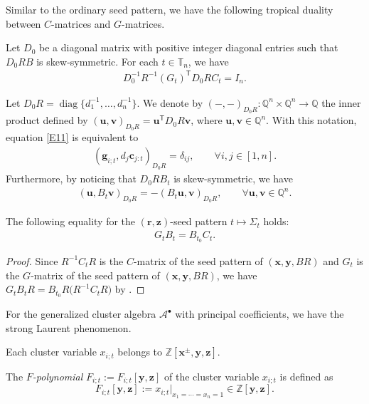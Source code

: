 Similar to the ordinary seed pattern, we have the following tropical duality between $C$-matrices and $G$-matrices.
\begin{Proposition}\label{P4}
 Let $D_0$ be a diagonal matrix with positive integer diagonal entries such that $D_0RB$ is skew-symmetric. For each $t\in \mathbb{T}_n$, we have
\begin{align}\label{E11}
D_0^{-1}R^{-1}(G_t)^{\mathsf T}D_0RC_t=I_n.
\end{align}
\end{Proposition}
Let $D_0R=\operatorname{diag}\bigl\{d_1^{-1},\dots, d_n^{-1}\bigr\}$. We denote by $(-,-)_{D_0R}\colon \mathbb{Q}^n\times \mathbb{Q}^n\to \mathbb{Q}$ the inner product defined by $(\mathbf{u},\mathbf{v})_{D_0R}=\mathbf{u}^{\mathsf T}D_0R\mathbf{v}$, where $\mathbf{u},\mathbf{v}\in \mathbb{Q}^n$. With this notation, equation \eqref{E11} is equivalent to
\begin{align}\label{E12}
 (\mathbf{g}_{i;t},d_j\mathbf{c}_{j:t})_{D_0R}=\delta_{ij},\qquad \forall i,j\in[1,n].
\end{align}
Furthermore, by noticing that $D_0RB_t$ is skew-symmetric, we have
\begin{align*}
 (\mathbf{u},B_t\mathbf{v})_{D_0R}=-(B_t\mathbf{u},\mathbf{v})_{D_0R},\qquad \forall  \mathbf{u},\mathbf{v}\in \mathbb{Q}^n.
\end{align*}

\begin{Proposition}\label{P5}
 The following equality for the $(\mathbf{r},\mathbf{z})$-seed pattern $t\mapsto \Sigma_t$ holds:
 \begin{align}\label{E14}
 G_tB_t=B_{t_0}C_t.
 \end{align}
\end{Proposition}
\begin{proof}
Since $R^{-1}C_tR$ is the $C$-matrix of the seed pattern of $(\mathbf{x},\mathbf{y}, BR)$ and $G_t$ is the $G$-matrix of the seed pattern of $(\mathbf{x},\mathbf{y}, BR)$, we have
$
G_tB_tR=B_{t_0}R\bigl(R^{-1}C_tR\bigr)
$
by \cite[equation~(6.14)]{fomin_zelevinsky_2007}.
\end{proof}

For the generalized cluster algebra $\mathcal{A}^\bullet$ with principal coefficients, we have the strong Laurent phenomenon.
\begin{Proposition}
 Each cluster variable $x_{i;t}$ belongs to $\mathbb{Z}[\mathbf{x}^\pm,\mathbf{y},\mathbf{z}]$.
\end{Proposition}
\begin{Definition}
 The {\it $F$-polynomial} $F_{i;t}:=F_{i;t}[\mathbf{y},\mathbf{z}]$ of the cluster variable $x_{i;t}$ is defined as
 \[
 F_{i;t}[\mathbf{y},\mathbf{z}]:=x_{i;t}|_{x_1=\cdots=x_n=1}\in \mathbb{Z}[\mathbf{y},\mathbf{z}].
 \]
\end{Definition}

